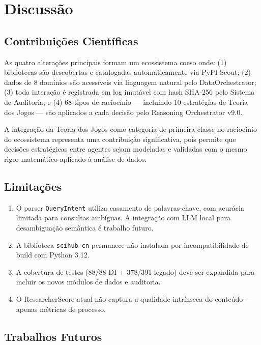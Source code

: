 \documentclass[12pt,a4paper]{article}
\begin{document}
\section{Discussão}

\subsection{Contribuições Científicas}

As quatro alterações principais formam um ecossistema coeso onde: (1) bibliotecas são descobertas e catalogadas automaticamente via PyPI Scout; (2) dados de 8 domínios são acessíveis via linguagem natural pelo DataOrchestrator; (3) toda interação é registrada em log imutável com hash SHA-256 pelo Sistema de Auditoria; e (4) 68 tipos de raciocínio --- incluindo 10 estratégias de Teoria dos Jogos --- são aplicados a cada decisão pelo Reasoning Orchestrator v9.0.

A integração da Teoria dos Jogos como categoria de primeira classe no raciocínio do ecossistema representa uma contribuição significativa, pois permite que decisões estratégicas entre agentes sejam modeladas e validadas com o mesmo rigor matemático aplicado à análise de dados.

\subsection{Limitações}

\begin{enumerate}[itemsep=1pt]
  \item O parser \texttt{QueryIntent} utiliza casamento de palavras-chave, com acurácia limitada para consultas ambíguas. A integração com LLM local para desambiguação semântica é trabalho futuro.
  \item A biblioteca \texttt{scihub-cn} permanece não instalada por incompatibilidade de build com Python 3.12.
  \item A cobertura de testes (88/88 DI + 378/391 legado) deve ser expandida para incluir os novos módulos de dados e auditoria.
  \item O ResearcherScore atual não captura a qualidade intrínseca do conteúdo --- apenas métricas de processo.
\end{enumerate}

\subsection{Trabalhos Futuros}
\end{document}
